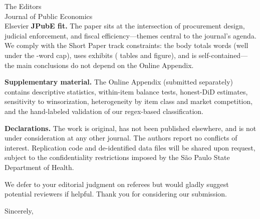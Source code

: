 \documentclass[11pt,a4paper]{letter}
\begin{document}
\begin{letter}{The Editors \\ Journal of Public Economics \\ Elsevier}
\medskip\noindent\textbf{JPubE fit.} The paper sits at the intersection of procurement design, judicial enforcement, and fiscal efficiency---themes central to the journal's agenda. We comply with the Short Paper track constraints: the body totals \BPbodyWordCount{} words (well under the \BPbodyWordCap-word cap), uses \BPexhibitsTotal{} exhibits (\BPexhibitsTables{} tables and \BPexhibitsFigures{} figure), and is self-contained---the main conclusions do not depend on the Online Appendix.

\medskip\noindent\textbf{Supplementary material.} The Online Appendix (submitted separately) contains descriptive statistics, within-item balance tests, honest-DiD estimates, sensitivity to winsorization, heterogeneity by item class and market competition, and the hand-labeled validation of our regex-based classification.

\medskip\noindent\textbf{Declarations.} The work is original, has not been published elsewhere, and is not under consideration at any other journal. The authors report no conflicts of interest. Replication code and de-identified data files will be shared upon request, subject to the confidentiality restrictions imposed by the S\~ao Paulo State Department of Health.

We defer to your editorial judgment on referees but would gladly suggest potential reviewers if helpful. Thank you for considering our submission.

\closing{Sincerely,}

\end{letter}
\end{document}
